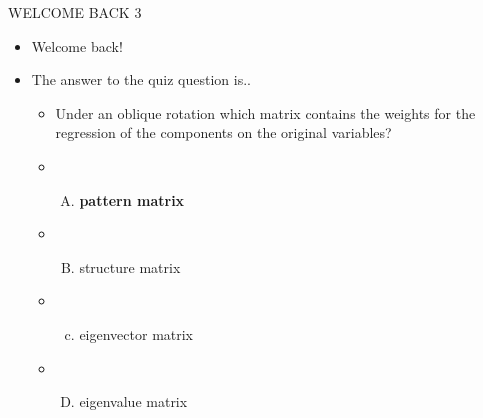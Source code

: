 \documentclass[
  ignorenonframetext,
]{beamer}
\providecommand{\tightlist}{%
  \setlength{\itemsep}{0pt}\setlength{\parskip}{0pt}}
\begin{document}
\begin{frame}{WELCOME BACK 3}
\protect\hypertarget{welcome-back-3}{}

\begin{itemize}
\tightlist
\item
  Welcome back!
\item
  The answer to the quiz question is..

  \begin{itemize}
  \item
    Under an oblique rotation which matrix contains the weights for the
    regression of the components on the original variables?
  \item
    \begin{enumerate}
    [A)]
    \tightlist
    \item
      \textbf{pattern matrix}
    \end{enumerate}
  \item
    \begin{enumerate}
    [A)]
    \setcounter{enumi}{1}
    \tightlist
    \item
      structure matrix
    \end{enumerate}
  \item
    \begin{enumerate}
    [a)]
    \setcounter{enumi}{2}
    \tightlist
    \item
      eigenvector matrix
    \end{enumerate}
  \item
    \begin{enumerate}
    [A)]
    \setcounter{enumi}{3}
    \tightlist
    \item
      eigenvalue matrix
    \end{enumerate}
  \end{itemize}
\end{itemize}

\end{frame}
\end{document}
